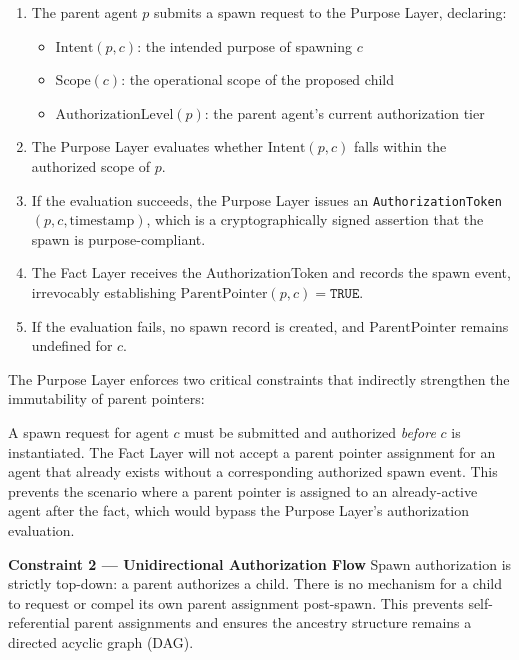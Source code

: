 \begin{protocol}
\label{proto:spawn-authorization}
\begin{enumerate}
\item The parent agent $p$ submits a spawn request to the Purpose Layer, declaring:
    \begin{itemize}
    \item $\text{Intent}(p, c)$: the intended purpose of spawning $c$
    \item $\text{Scope}(c)$: the operational scope of the proposed child
    \item $\text{AuthorizationLevel}(p)$: the parent agent's current authorization tier
    \end{itemize}

\item The Purpose Layer evaluates whether $\text{Intent}(p, c)$ falls within the authorized scope of $p$.

\item If the evaluation succeeds, the Purpose Layer issues an \texttt{AuthorizationToken}$(p, c, \text{timestamp})$, which is a cryptographically signed assertion that the spawn is purpose-compliant.

\item The Fact Layer receives the AuthorizationToken and records the spawn event, irrevocably establishing $\text{ParentPointer}(p, c) = \texttt{TRUE}$.

\item If the evaluation fails, no spawn record is created, and $\text{ParentPointer}$ remains undefined for $c$.
\end{enumerate}
\end{protocol}

The Purpose Layer enforces two critical constraints that indirectly strengthen the immutability of parent pointers:

\begin{constraint}
A spawn request for agent $c$ must be submitted and authorized \emph{before} $c$ is instantiated. The Fact Layer will not accept a parent pointer assignment for an agent that already exists without a corresponding authorized spawn event. This prevents the scenario where a parent pointer is assigned to an already-active agent after the fact, which would bypass the Purpose Layer's authorization evaluation.

\item \textbf{Constraint 2 — Unidirectional Authorization Flow}
Spawn authorization is strictly top-down: a parent authorizes a child. There is no mechanism for a child to request or compel its own parent assignment post-spawn. This prevents self-referential parent assignments and ensures the ancestry structure remains a directed acyclic graph (DAG).
\end{constraint}

